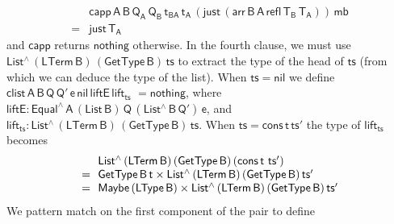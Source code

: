 \documentclass[sigplan,10pt]{acmart}
\begin{document}
\[\begin{array}{ll}
 & \!\!\mathsf{capp\, A \,B \, Q_A \, Q_B \, t_{BA}\, t_A \, (just \,
  (arr\, B \,A\, refl\, T_B\, T_A))\, mb}\\ 
= & \!\!\mathsf{just\, T_A}
\end{array}\]
and $\mathsf{capp}$ returns $\mathsf{nothing}$ otherwise.  In the
fourth clause, we must use $\mathsf{List^{\wedge}\, (LTerm\, B)\,
  (GetType\, B)\, ts}$ to extract the type of the head of
$\mathsf{ts}$ (from which we can deduce the type of the list). When
$\mathsf{ts} = \mathsf{nil}$ we define $\mathsf{clist\, A\, B\, Q\,
  Q'\, e\, nil \, liftE\, lift_{ts}}$ $\mathsf{= nothing}$, where
$\mathsf{liftE : Equal^{\wedge}\, A\, (List\,B) \, Q\,
  (List^{\wedge}\, B\, Q')\, e}$, and $\mathsf{lift_{ts} :
  List^{\wedge}\, (LTerm\, B)\, (GetType\, B)\, ts}$.  When
$\mathsf{ts} = \mathsf{cons\,t\,ts'}$
the type of $\mathsf{lift_{ts}}$ becomes
\[\begin{array}{ll}
& \!\!\mathsf{List^{\wedge}\, (LTerm\, B)\, (GetType\, B)\, (cons\, t}$
$\mathsf{ts')}\\
= & \!\!\mathsf{GetType\, B\, t \times List^{\wedge}\, (LTerm\, B)\,
  (GetType\, B)\, ts'}\\
= & \!\! \mathsf{Maybe\, (LType\, B) \times List^{\wedge}\, (LTerm\, B)\,
  (GetType\, B)\, ts'}
\end{array}\] We pattern match on the first component
of the pair to define
\end{document}
